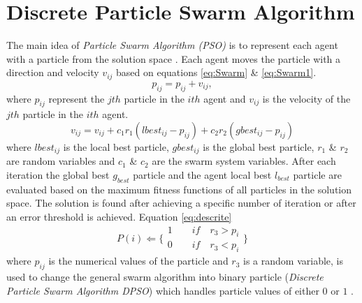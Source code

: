 \section{Discrete Particle Swarm Algorithm}
\label{sec:ParticleSwarmAlgorithm}
The main idea of \textit{Particle Swarm Algorithm (PSO)} is to represent each agent with a particle from the solution space \cite{PSOFirst}. Each agent moves the particle with a direction and velocity $v_{ij}$ based on equations \ref{eq:Swarm} \& \ref{eq:Swarm1}.
\begin{equation}
p_{ij}=p_{ij}+v_{ij},
\label{eq:Swarm1}
\end{equation}
where $p_{ij}$ represent the $jth$ particle in the $ith$ agent and $v_{ij}$ is the velocity of the $jth$ particle in the $ith$ agent.
 \begin{equation}
v_{ij}  = v_{ij}  + c_1 r_1 (lbest_{ij}  - p_{ij} ) + c_2 r_2 (gbest_{ij}  - p_{ij} )
\label{eq:Swarm}
\end{equation}
 where $lbest_{ij}$ is the local best particle, $gbest_{ij}$ is the global best particle, $r_1$ \& $r_2$ are random variables and $c_1$ \& $c_2$ are the swarm system variables.
 After each iteration the global best $g_{best}$ particle and the agent local best $l_{best}$ particle are evaluated based on the maximum fitness functions of all particles in the solution space. The solution is found after achieving a specific number of iteration or after an error threshold is achieved.
Equation \ref{eq:descrite}  
\begin{equation}
   P(i)\Leftarrow 
\{
\begin{array}{c} 
1 \quad \quad if\quad r_{3}>p_{i}  \\

0 \quad \quad if\quad r_{3}<p_{i} 
\label{eq:descrite}
\end{array}\}
\end{equation}
 where $p_{ij}$ is the numerical values of the particle and $r_{3}$ is a random variable, is used to change the general swarm algorithm into binary particle (\textit{Discrete Particle Swarm Algorithm DPSO}) which handles particle values of either $0$ or $1$ \cite{PSODisceret}. 